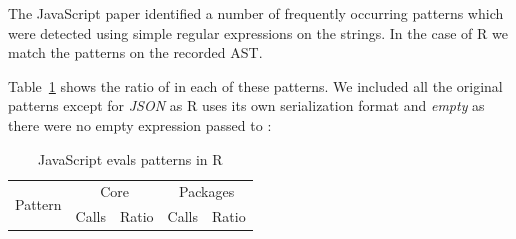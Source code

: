 \documentclass[conference]{IEEEtran}
\begin{document}
The JavaScript paper identified a number of frequently occurring \eval patterns
which were detected using simple regular expressions on the \eval strings. In
the case of R we match the patterns on the recorded AST.

Table~\ref{table:js-pattens-in-r} shows the ratio of \eval in each of these
patterns. We included all the original patterns except for \emph{JSON} as R uses
its own serialization format and \emph{empty} as there were no empty expression
passed to \eval:

\begin{table}[ht]%
  \centering
\begin{tabular}{r|r|r|r|r}\hline
\multirow{2}{*}{Pattern} & \multicolumn{2}{c|}{Core} & \multicolumn{2}{c}{Packages} \\
                         & Calls & Ratio            & Calls & Ratio \\\hline

\end{tabular}
\caption{JavaScript evals patterns in R}
\label{table:js-pattens-in-r}
\end{table}

\end{document}
